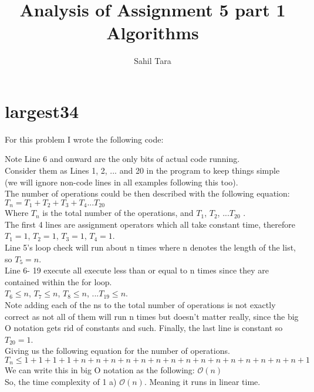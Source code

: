 \documentclass[12pt]{article}
\begin{document}
\title{Analysis of Assignment 5 part 1 Algorithms}
\author{Sahil Tara}
\maketitle

\section{largest34}
For this problem I wrote the following code:

Note Line 6 and onward are the only bits of actual code running.\\
Consider them as Lines 1, 2, ... and 20 in the program to keep things simple \\
(we will ignore non-code lines in all examples following this too).\\
The number of operations could be then described with the following equation:\\
$T_n = T_1 + T_2 + T_3 + T_4 ... T_{20} $\\
Where $T_n$ is the total number of the operations, and $T_1$, $T_2$, $... T_{20}$ .\\
The first 4 lines are assignment operators which all take constant time, therefore $T_1 = 1$, $T_2 = 1$, $T_3 = 1$, $T_4 = 1$.\\
Line 5's loop check will run about n times where n denotes the length of the list, so $T_5 = n$.\\
Line 6- 19 execute  all execute less than or equal to n times since
they are contained within the for loop.\\
$T_6 \leq n$, $T_7 \leq n$, $T_8 \leq n$, $... T_{19} \leq n$.\\
Note adding each of the ns to the total number of operations is not exactly correct as not all of them will run n times but doesn't matter really, since the big O notation gets rid of constants and such. 
Finally, the last line is constant so $T_{20} = 1$.\\
Giving us the following equation for the number of operations.\\
$T_n \leq 1 + 1 + 1 + 1 +  n + n + n + n + n + n + n + n + n + n + n + n + n + n + n + 1$\\
We can write this in big O notation as the following:
$\mathcal{O}(n)$\\
So, the time complexity of 1 a) $\mathcal{O}(n)$. Meaning it runs in linear time.\\
\end{document}
